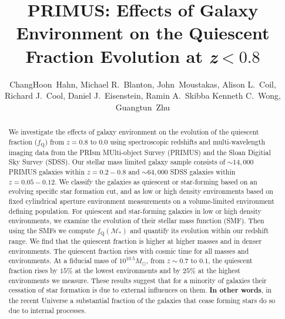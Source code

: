 \documentclass{emulateapj}
\begin{document}
\title{PRIMUS: Effects of Galaxy Environment on the Quiescent Fraction Evolution at \lowercase{\textit{z}}$<0.8$}
\author{
ChangHoon~Hahn, 
Michael R.~Blanton, 
John~Moustakas,
Alison L.~Coil, 
Richard J.~Cool, 
Daniel J.~Eisenstein,
Ramin A.~Skibba
Kenneth C.~Wong, 
Guangtun~Zhu
}
\begin{abstract}
We investigate the effects of galaxy environment on the evolution of
the quiescent fraction ($f_{\mathrm{Q}}$) from $z =0.8 $ to $ 0.0$ using
spectroscopic redshifts and multi-wavelength imaging data from the
PRIsm MUlti-object Survey (PRIMUS) and the Sloan Digitial Sky Survey
(SDSS). Our stellar mass limited galaxy sample consists of $\sim
14,000$ PRIMUS galaxies within $z = 0.2-0.8$ and $\sim 64,000$ SDSS
galaxies within $z = 0.05-0.12$. We classify the galaxies as quiescent
or star-forming based on an evolving specific star formation cut, and
as low or high density environments based on fixed cylindrical
aperture environment measurements on a volume-limited environment
defining population. For quiescent and
star-forming galaxies in low or high density environments, we examine
the evolution of their stellar mass function (SMF). Then using the
SMFs we compute $f_{\mathrm{Q}}(\mathcal{M}_{*})$ and quantify its
evolution within our redshift range. We find that the quiescent
fraction is higher at higher masses and in denser environments. The
quiescent fraction rises with cosmic time for all masses and
environments. At a fiducial mass of $10^{10.5}M_\odot$, from $z\sim
0.7$ to $0.1$, the quiescent fraction rises by $15\%$ at the
lowest environments and by $25\%$ at the highest environments we measure.
These results suggest that for a minority of galaxies their cessation
of star formation is due to external influences on
them. {\bf In other words}, in the recent Universe a substantial fraction of the
galaxies that cease forming stars do so due to internal processes.
\end{abstract}
\end{document}
